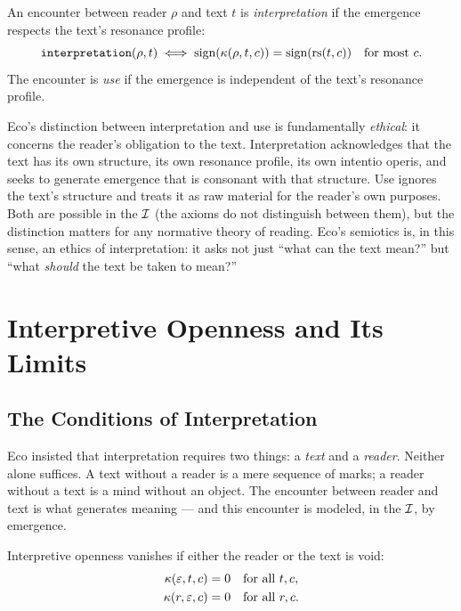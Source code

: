 \begin{definition}
\label{def:interpretation-use}
An encounter between reader $\rho$ and text $t$ is \emph{interpretation}
if the emergence respects the text's resonance profile:
\[
  \texttt{interpretation}(\rho, t) \iff
  \text{sign}(\kappa(\rho, t, c)) = \text{sign}(\mathrm{rs}(t, c))
  \quad \text{for most } c.
\]
The encounter is \emph{use} if the emergence is independent of the
text's resonance profile.
\end{definition}

\begin{interpretation}
Eco's distinction between interpretation and use is fundamentally
\emph{ethical}: it concerns the reader's obligation to the text.
Interpretation acknowledges that the text has its own structure, its
own resonance profile, its own intentio operis, and seeks to generate
emergence that is consonant with that structure. Use ignores the
text's structure and treats it as raw material for the reader's own
purposes. Both are possible in the $\mathcal{I}$ (the axioms do not
distinguish between them), but the distinction matters for any
normative theory of reading. Eco's semiotics is, in this sense, an
ethics of interpretation: it asks not just ``what can the text mean?''
but ``what \emph{should} the text be taken to mean?''
\end{interpretation}

\section{Interpretive Openness and Its Limits}

\subsection{The Conditions of Interpretation}

Eco insisted that interpretation requires two things: a \emph{text}
and a \emph{reader}. Neither alone suffices. A text without a reader
is a mere sequence of marks; a reader without a text is a mind without
an object. The encounter between reader and text is what generates
meaning --- and this encounter is modeled, in the $\mathcal{I}$, by emergence.

\begin{theorem}
\label{thm:openness-requires-both}
Interpretive openness vanishes if either the reader or the text is
void:
\begin{align}
  \kappa(\varepsilon, t, c) &= 0 \quad \text{for all } t, c, \\
  \kappa(r, \varepsilon, c) &= 0 \quad \text{for all } r, c.
\end{align}
\end{theorem}

